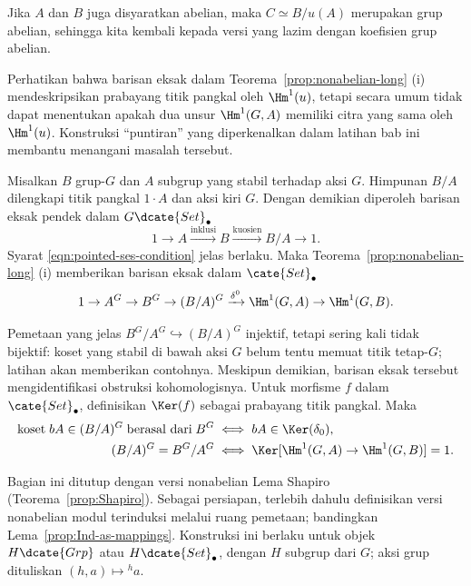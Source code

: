 Jika $A$ dan $B$ juga disyaratkan abelian, maka
$C\simeq B/u(A)$ merupakan grup abelian, sehingga kita kembali kepada versi
yang lazim dengan koefisien grup abelian.

Perhatikan bahwa barisan eksak dalam
Teorema~\ref{prop:nonabelian-long} (i) mendeskripsikan prabayang titik pangkal
oleh $\Hm^1(u)$, tetapi secara umum tidak dapat menentukan apakah dua unsur
$\Hm^1(G,A)$ memiliki citra yang sama oleh $\Hm^1(u)$. Konstruksi
``puntiran'' yang diperkenalkan dalam latihan bab ini membantu menangani
masalah tersebut.

\begin{contoh}
	Misalkan $B$ grup-$G$ dan $A$ subgrup yang stabil terhadap aksi $G$.
	Himpunan $B/A$ dilengkapi titik pangkal $1\cdot A$ dan aksi kiri $G$.
	Dengan demikian diperoleh barisan eksak pendek dalam
	$G\dcate{Set}_\bullet$
	\[ 1 \to A \xrightarrow{\text{inklusi}} B \xrightarrow{\text{kuosien}} B/A \to 1. \]
	Syarat \eqref{eqn:pointed-ses-condition} jelas berlaku. Maka
	Teorema~\ref{prop:nonabelian-long} (i) memberikan barisan eksak dalam
	$\cate{Set}_\bullet$
	\[ 1 \to A^G \to B^G \to (B/A)^G \xrightarrow{\delta^0} \Hm^1(G, A) \to \Hm^1(G, B). \]
	
	Pemetaan yang jelas $B^G/A^G\hookrightarrow(B/A)^G$ injektif, tetapi
	sering kali tidak bijektif: koset yang stabil di bawah aksi $G$ belum tentu
	memuat titik tetap-$G$; latihan akan memberikan contohnya. Meskipun
	demikian, barisan eksak tersebut mengidentifikasi obstruksi kohomologisnya.
	Untuk morfisme $f$ dalam $\cate{Set}_\bullet$, definisikan $\Ker(f)$
	sebagai prabayang titik pangkal. Maka
	\begin{align*}
		\text{koset}\; bA \in (B/A)^G \;\text{berasal dari}\; B^G & \iff bA \in \Ker(\delta_0), \\
		(B/A)^G = B^G/A^G & \iff \Ker[\Hm^1(G, A) \to \Hm^1(G, B)] = 1.
	\end{align*}
\end{contoh}

Bagian ini ditutup dengan versi nonabelian Lema Shapiro
(Teorema~\ref{prop:Shapiro}). Sebagai persiapan, terlebih dahulu definisikan
versi nonabelian modul terinduksi melalui ruang pemetaan; bandingkan
Lema~\ref{prop:Ind-as-mappings}. Konstruksi ini berlaku untuk objek
$H\dcate{Grp}$ atau $H\dcate{Set}_\bullet$, dengan $H$ subgrup dari $G$;
aksi grup dituliskan $(h,a)\mapsto{}^ha$.

